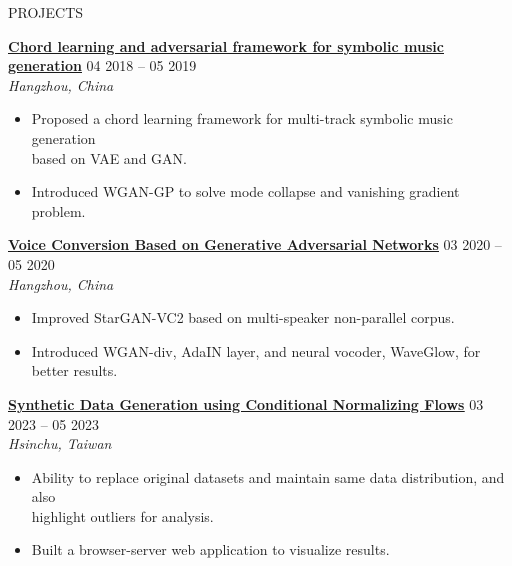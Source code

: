 \documentclass{resume}
\begin{document}
\begin{rSection}{PROJECTS}
\vspace{-1.25em}
    \item \textbf{\href{https://docs.google.com/presentation/d/1797idRRmgeD2JnUslGbflmGUO2X5lMY6/edit?usp=drive_link&ouid=101248488395326982475&rtpof=true&sd=true}{\textbf{\large{\underline{Chord learning and adversarial framework for symbolic music generation}}}}} \hfill {04 2018 – 05 2019}\\
    \mbox{} \hfill \textit{Hangzhou, China}
    \begin{itemize}
        \item Proposed a chord learning framework for multi-track symbolic music generation\\based on VAE and GAN.
        \item Introduced WGAN-GP to solve mode collapse and vanishing gradient problem.
    \end{itemize}

    \item \textbf{\href{https://drive.google.com/file/d/1736XHtaeT58FL_gbOa9XjlyA6xAXDkg2/view?usp=drive_link}{\textbf{\large{\underline{Voice Conversion Based on Generative Adversarial Networks}}}}} \hfill {03 2020 -- 05 2020}\\
    \mbox{} \hfill \textit{Hangzhou, China}
    \begin{itemize}
        \item Improved StarGAN-VC2 based on multi-speaker non-parallel corpus.
        \item Introduced WGAN-div, AdaIN layer, and neural vocoder, WaveGlow, for better results.
    \end{itemize}
    
    \item \textbf{\href{https://drive.google.com/file/d/176xCWH6j0VAuoXLtB_HppxyZN-6ezq9_/view?usp=drive_link}{\textbf{\large{\underline{Synthetic Data Generation using Conditional Normalizing Flows}}}}} \hfill {03 2023 -- 05 2023}\\
    \mbox{} \hfill \textit{Hsinchu, Taiwan}
    \begin{itemize}
        \item Ability to replace original datasets and maintain same data distribution, and also\\
        highlight outliers for analysis.
        \item Built a browser-server web application to visualize results.
    \end{itemize}


\end{rSection}
\end{document}
